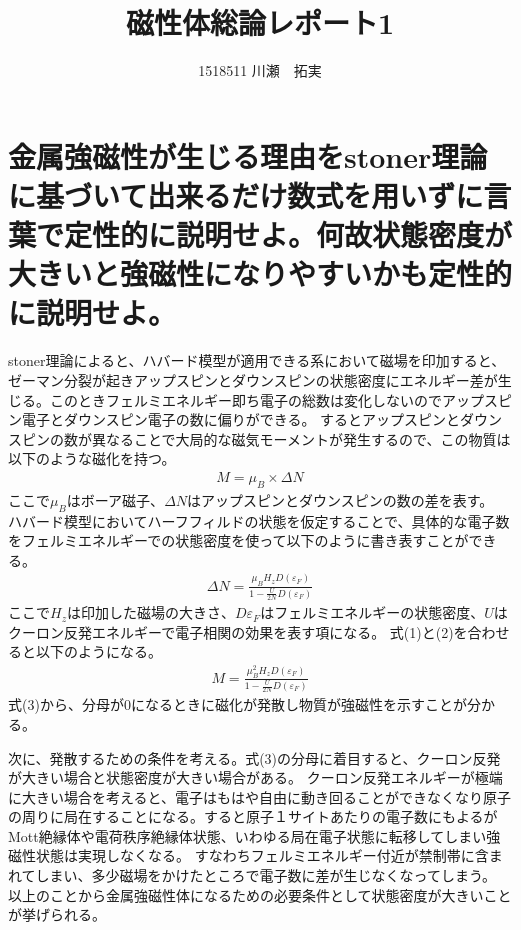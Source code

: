 \documentclass{jsarticle}
\begin{document}
\title{磁性体総論レポート1}
\author{1518511 川瀬　拓実}
\maketitle

\newpage

\section*{金属強磁性が生じる理由をstoner理論に基づいて出来るだけ数式を用いずに言葉で定性的に説明せよ。何故状態密度が大きいと強磁性になりやすいかも定性的に説明せよ。}
stoner理論によると、ハバード模型が適用できる系において磁場を印加すると、ゼーマン分裂が起きアップスピンとダウンスピンの状態密度にエネルギー差が生じる。このときフェルミエネルギー即ち電子の総数は変化しないのでアップスピン電子とダウンスピン電子の数に偏りができる。
するとアップスピンとダウンスピンの数が異なることで大局的な磁気モーメントが発生するので、この物質は以下のような磁化を持つ。
\begin{eqnarray}
  M = \mu_{B} \times \Delta N
\end{eqnarray}
ここで$\mu_{B}$はボーア磁子、$\Delta N$はアップスピンとダウンスピンの数の差を表す。
ハバード模型においてハーフフィルドの状態を仮定することで、具体的な電子数をフェルミエネルギーでの状態密度を使って以下のように書き表すことができる。
\begin{eqnarray}
  \Delta N = \frac{\mu_{B}H_{z}D(\varepsilon_{F})}{1 - \frac{U}{2N} D(\varepsilon_{F})}
\end{eqnarray}
ここで$H_z$は印加した磁場の大きさ、$D{\varepsilon_F}$はフェルミエネルギーの状態密度、$U$はクーロン反発エネルギーで電子相関の効果を表す項になる。
式(1)と(2)を合わせると以下のようになる。
\begin{eqnarray}
  M = \frac{\mu_{B}^{2} H_{z}D(\varepsilon_{F})}{1 - \frac{U}{2N} D(\varepsilon_{F})}
\end{eqnarray}
式(3)から、分母が0になるときに磁化が発散し物質が強磁性を示すことが分かる。

次に、発散するための条件を考える。式(3)の分母に着目すると、クーロン反発が大きい場合と状態密度が大きい場合がある。
クーロン反発エネルギーが極端に大きい場合を考えると、電子はもはや自由に動き回ることができなくなり原子の周りに局在することになる。すると原子１サイトあたりの電子数にもよるがMott絶縁体や電荷秩序絶縁体状態、いわゆる局在電子状態に転移してしまい強磁性状態は実現しなくなる。
すなわちフェルミエネルギー付近が禁制帯に含まれてしまい、多少磁場をかけたところで電子数に差が生じなくなってしまう。
以上のことから金属強磁性体になるための必要条件として状態密度が大きいことが挙げられる。
\end{document}

